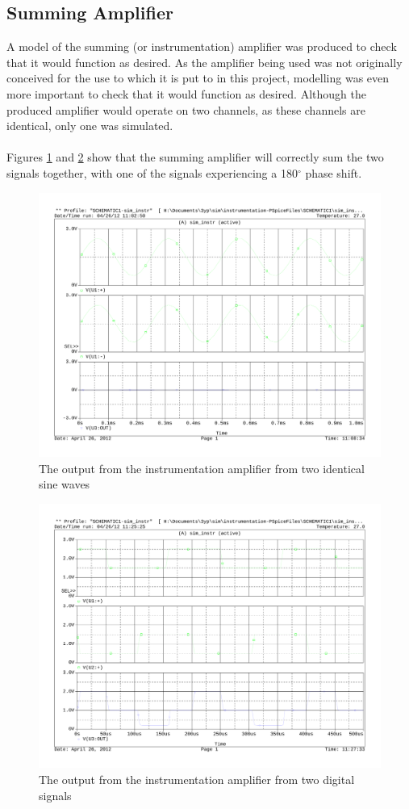 \subsection{Summing Amplifier}
A model of the summing (or instrumentation) amplifier was produced to check that it would function
as desired.
As the amplifier being used was not originally conceived for the use to which
it is put to in this project, modelling was even more important to check that
it would function as desired.
Although the produced amplifier would operate on two channels, as these channels
are identical, only one was simulated.
\\
\\
Figures \ref{fig:instramp} and \ref{fig:instrampbeat} show that the summing amplifier will correctly sum the two signals together, with one of the signals experiencing a 180$^{\circ}$ phase shift.

\begin{figure}[H]
	\centering
	\includegraphics[width=\textwidth]{./img/instrumentationamp.pdf}
	\caption{The output from the instrumentation amplifier from two identical sine waves}
	\label{fig:instramp}
\end{figure}

\begin{figure}[H]
	\centering
	\includegraphics[width=\textwidth]{./img/instrumentationamp_dig.pdf}
	\caption{The output from the instrumentation amplifier from two digital signals}
	\label{fig:instrampbeat}
\end{figure}

